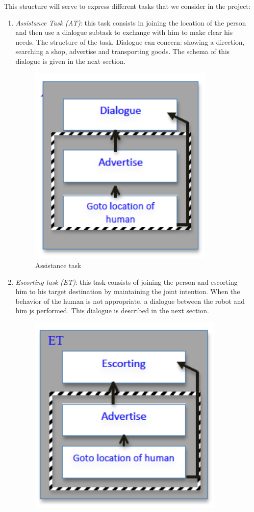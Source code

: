 \documentclass{article}
\begin{document}
This structure will serve to express different tasks that we consider in the project: 
\begin{enumerate}
\item {\it Assistance Task (AT)}: this task consists in joining the location of the person and then use a dialogue subtask to exchange with him to make clear his needs. The structure of the task. Dialogue can concern: showing a direction, searching a shop, advertise and transporting goods. The schema of this dialogue is given in the next section.
\begin{figure}[htbp]
\begin{center}
\includegraphics[height=10cm]{AssistanceTask}
\caption{Assistance task }
\label{FigAssistanceTask}
\end{center}
\end{figure}
\item {\it Escorting task (ET)}: this task consists of joining the person and escorting him to his target destination by maintaining the joint intention. When the behavior of the human is not appropriate, a dialogue between the robot and him js performed. This dialogue is described in the next section. 
\begin{figure}[htbp]
\begin{center}
\includegraphics[height=10cm]{EscortingTask}

\end{center}
\end{figure}
\end{enumerate}
\end{document}
